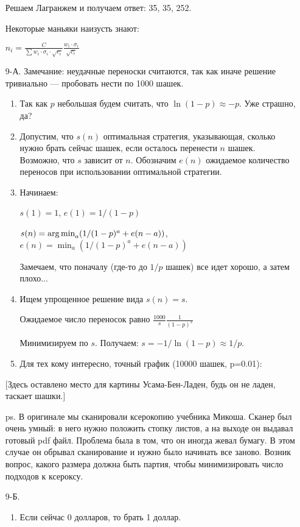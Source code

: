 \begin{enumerate}
Решаем Лагранжем и получаем ответ: 35, 35, 252.

Некоторые маньяки наизусть знают:

$n_{i}=\frac{C}{\sum w_{i}\cdot \sigma_{i}\cdot\sqrt{c_{i}}}\frac{w_{i}\cdot \sigma_{i}}{\sqrt{c_{i}}}$
\item[9-А.] Замечание: неудачные переноски считаются, так как иначе решение
тривиально — пробовать нести по 1000 шашек.
\begin{enumerate}
\item  Так как $p$ небольшая будем считать, что $\ln(1-p)\approx -p$. Уже страшно, да?
\item Допустим, что $s(n)$ оптимальная стратегия, указывающая, сколько нужно брать
сейчас шашек, если осталось перенести $n$ шашек. Возможно, что $s$ зависит от $n$.
Обозначим $e(n)$ ожидаемое количество переносов при использовании оптимальной стратегии.
\item Начинаем:

$s(1)=1$, $e(1)=1/(1-p)$

$s(n)=\operatorname*{arg\,min}_{a}(1/(1-p)^{a}+e(n-a))$, $e(n)=\min_{a}(1/(1-p)^{a}+e(n-a))$

Замечаем, что поначалу (где-то до $1/p$ шашек) все идет хорошо, а затем плохо...
\item Ищем упрощенное решение вида $s(n)=s$.

Ожидаемое число переносок равно $\frac{1000}{s}\frac{1}{(1-p)^{s}}$

Минимизируем по $s$. Получаем: $s=-1/\ln(1-p)\approx 1/p$.
\item Для тех кому интересно, точный график (10000 шашек, p=0.01):
\end{enumerate}

$[$Здесь оставлено место для картины Усама-Бен-Ладен, будь он не ладен, таскает шашки.$]$

ps. В оригинале мы сканировали ксерокопию учебника Микоша. Сканер был очень умный:
в него нужно положить стопку листов, а на выходе он выдавал готовый pdf файл.
Проблема была в том, что он иногда жевал бумагу. В этом случае он обрывал
сканирование и нужно было начинать все заново. Возник вопрос, какого размера должна
быть партия, чтобы минимизировать число подходов к ксероксу.

\item[9-Б.]
\begin{enumerate}
\item Если сейчас 0 долларов, то брать 1 доллар.


\end{enumerate}
\end{enumerate}
